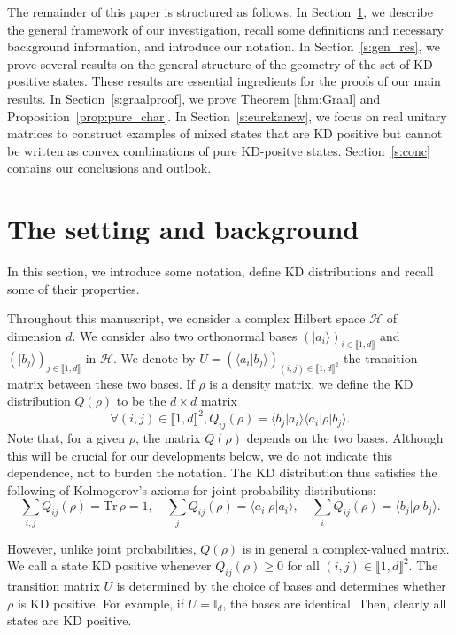 \documentclass[a4paper, notitlepage, 11pt]{article}
\numberwithin{equation}{section}
\newcommand{\bra}[1]{\langle #1|}
\newcommand{\cket}[1]{|#1\rangle}
\newcommand{\bracket}[2]{\langle #1|#2\rangle}
\newcommand{\bbone}{\mathbb{I}}
\newcommand{\Tr}{\mathrm{Tr}\,}
\renewcommand{\H}{\mathcal{H}}
\newcommand{\IntEnt}[2]{\llbracket #1 , #2 \rrbracket}
\begin{document}
 The {remainder of this} paper is structured as follows. In Section~\ref{s:setting}, we describe the general framework of our investigation, recall some definitions and necessary background information, and {introduce our}  notation. In Section~\ref{s:gen_res}, we  
prove several results on the {general structure of the} geometry of the set of KD-positive states. {These results} are essential ingredients for the proofs of our main results. 
In Section~\ref{s:graalproof}, we prove Theorem \ref{thm:Graal} and Proposition~\ref{prop:pure_char}. 
 In Section~\ref{s:eurekanew}, we focus on real unitary matrices to construct examples of mixed states that are KD positive but cannot be written as convex combinations of pure KD-positve states. Section~\ref{s:conc} contains our conclusions and outlook. 

\section{The setting and background}\label{s:setting}


In this section, we introduce some notation, define KD distributions and recall some of their  properties.

Throughout this manuscript, we consider a complex Hilbert space $\H$ of dimension $d$. We consider also two orthonormal bases $ \left(\cket{a_i}\right)_{i\in\IntEnt{1}{d}}$ and $\left(\cket{b_j}\right)_{j\in\IntEnt{1}{d}}$ in $\H$. We denote by $U=\left(\bracket{a_i}{b_j}\right)_{(i,j)\in\IntEnt{1}{d}^2}$ the transition matrix between these two bases. If $\rho$ is a density matrix, we define the KD distribution $Q(\rho)$  to be the $d \times d$ matrix~\cite{kirkwood1933, dirac1945}
\begin{equation}\label{eq:KDGV2}
\forall (i,j)\in \IntEnt{1}{d}^2, Q_{ij}(\rho) = \bracket{b_j}{a_i}\bra{a_i}\rho\cket{b_j}.
\end{equation}
Note that, for a given $\rho$, the matrix $Q(\rho)$ depends on the two bases. Although this will be crucial for our developments below, we do not indicate this dependence, not to burden the notation. 
The KD distribution thus satisfies the following   of Kolmogorov's axioms for joint probability distributions:
\begin{equation}\label{eq:Qbasics}
\sum_{i,j} Q_{ij}(\rho)=\Tr \rho=1, \quad \sum_j Q_{ij}(\rho)=\langle a_i|\rho|a_i\rangle,\quad \sum_i Q_{ij}(\rho)=\langle b_j|\rho|b_j\rangle.
\end{equation}

However, unlike joint probabilities, $Q(\rho)$ is in general a complex-valued matrix. {We call} a state KD positive whenever  $Q_{ij}(\rho)\geq 0$ for all $(i,j)\in\IntEnt{1}{d}^2$. The transition matrix $U$ is determined by the choice of bases and  determines whether $\rho$ is KD positive. For example, if $U = \bbone_{d}$, the bases are identical. Then, clearly all states are KD positive. 
\end{document}
